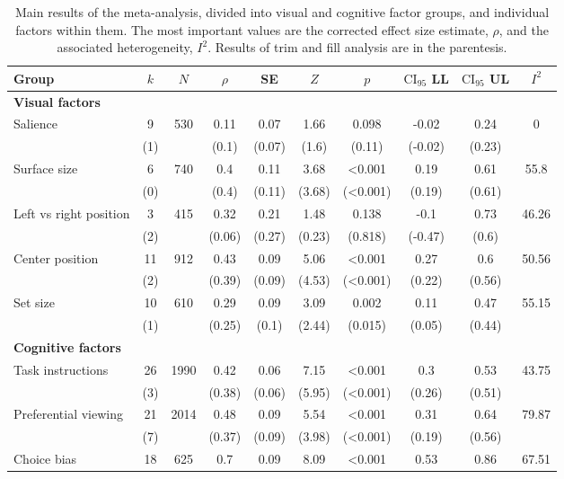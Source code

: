\begin{table}[ht]
\centering
\caption{Main results of the meta-analysis, divided into visual and cognitive factor groups, and individual factors within them. The most important values are the corrected effect size estimate, $\rho$, and the associated heterogeneity, $I^2$. Results of trim and fill analysis are in the parentesis.} 
\label{tab:main_results}
\begingroup\small
\begin{tabular}{lccccccccc}
  \hline
Group & $k$ & $N$ & $\rho$ & SE & $Z$ & $p$ & $\textrm{CI}_{95}$ LL & $\textrm{CI}_{95}$ UL & $I^2$ \\ 
  \hline
\textbf{Visual factors} &  &  &  &  &  &  &  &  &  \\ 
  Salience & 9 & 530 & 0.11 & 0.07 & 1.66 & 0.098 & -0.02 & 0.24 & 0 \\ 
   & (1) &  & (0.1) & (0.07) & (1.6) & (0.11) & (-0.02) & (0.23) &  \\ 
  Surface size & 6 & 740 & 0.4 & 0.11 & 3.68 & <0.001 & 0.19 & 0.61 & 55.8 \\ 
   & (0) &  & (0.4) & (0.11) & (3.68) & (<0.001) & (0.19) & (0.61) &  \\ 
  Left vs right position & 3 & 415 & 0.32 & 0.21 & 1.48 & 0.138 & -0.1 & 0.73 & 46.26 \\ 
   & (2) &  & (0.06) & (0.27) & (0.23) & (0.818) & (-0.47) & (0.6) &  \\ 
  Center position & 11 & 912 & 0.43 & 0.09 & 5.06 & <0.001 & 0.27 & 0.6 & 50.56 \\ 
   & (2) &  & (0.39) & (0.09) & (4.53) & (<0.001) & (0.22) & (0.56) &  \\ 
  Set size & 10 & 610 & 0.29 & 0.09 & 3.09 & 0.002 & 0.11 & 0.47 & 55.15 \\ 
   & (1) &  & (0.25) & (0.1) & (2.44) & (0.015) & (0.05) & (0.44) &  \\ 
  \textbf{Cognitive factors} &  &  &  &  &  &  &  &  &  \\ 
  Task instructions & 26 & 1990 & 0.42 & 0.06 & 7.15 & <0.001 & 0.3 & 0.53 & 43.75 \\ 
   & (3) &  & (0.38) & (0.06) & (5.95) & (<0.001) & (0.26) & (0.51) &  \\ 
  Preferential viewing & 21 & 2014 & 0.48 & 0.09 & 5.54 & <0.001 & 0.31 & 0.64 & 79.87 \\ 
   & (7) &  & (0.37) & (0.09) & (3.98) & (<0.001) & (0.19) & (0.56) &  \\ 
  Choice bias & 18 & 625 & 0.7 & 0.09 & 8.09 & <0.001 & 0.53 & 0.86 & 67.51 \\ 

\end{tabular}
\end{table}
